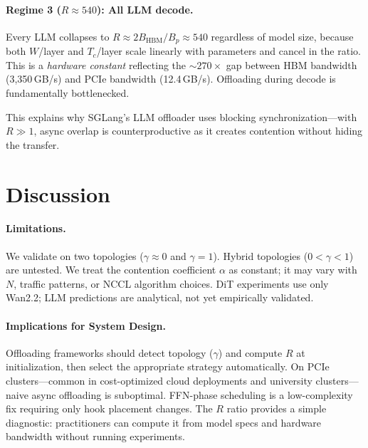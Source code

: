 \documentclass{article}
\begin{document}
\paragraph{Regime 3 ($R \approx 540$): All LLM decode.} Every LLM collapses to $R \approx 2 B_{\text{HBM}} / B_p \approx 540$ regardless of model size, because both $W$/layer and $T_c$/layer scale linearly with parameters and cancel in the ratio. This is a \emph{hardware constant} reflecting the ${\sim}270\times$ gap between HBM bandwidth (3{,}350\,GB/s) and PCIe bandwidth (12.4\,GB/s). Offloading during decode is fundamentally bottlenecked.

This explains why SGLang's LLM offloader uses blocking synchronization---with $R \gg 1$, async overlap is counterproductive as it creates contention without hiding the transfer.

\section{Discussion}
\label{sec:discussion}

\paragraph{Limitations.}
We validate on two topologies ($\gamma \approx 0$ and $\gamma = 1$). Hybrid topologies ($0 < \gamma < 1$) are untested. We treat the contention coefficient $\alpha$ as constant; it may vary with $N$, traffic patterns, or NCCL algorithm choices. DiT experiments use only Wan2.2; LLM predictions are analytical, not yet empirically validated.

\paragraph{Implications for System Design.}
Offloading frameworks should detect topology ($\gamma$) and compute $R$ at initialization, then select the appropriate strategy automatically. On PCIe clusters---common in cost-optimized cloud deployments and university clusters---naive async offloading is suboptimal. FFN-phase scheduling is a low-complexity fix requiring only hook placement changes. The $R$ ratio provides a simple diagnostic: practitioners can compute it from model specs and hardware bandwidth without running experiments.

\end{document}
